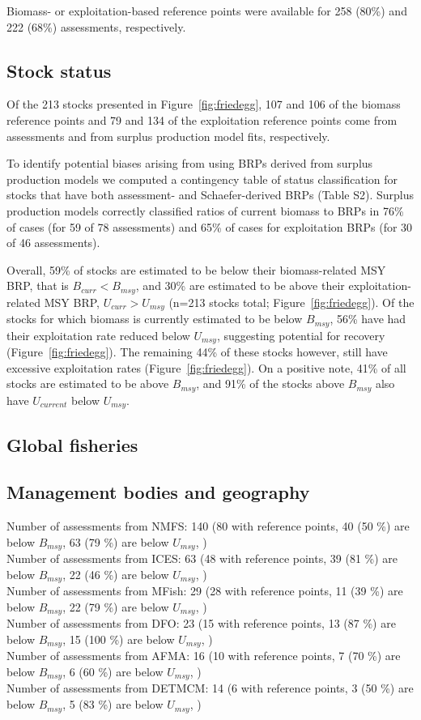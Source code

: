 Biomass- or exploitation-based reference points were available for
258 (80\%) and
222 (68\%)
assessments, respectively.

\subsection*{Stock status}
\noindent
Of the
213 stocks presented in
Figure~\ref{fig:friedegg}, 107 and
106 of the biomass reference points and
79 and
134 of the exploitation reference
points come from assessments and from surplus production model fits,
respectively.

To identify potential biases arising from using BRPs
derived from surplus production models we computed a contingency table
of status classification for stocks that have both assessment- and
Schaefer-derived BRPs (Table S2). Surplus production models correctly
classified ratios of current biomass to BRPs in
76\% of cases (for 59
of 78 assessments) and 65\%
of cases for exploitation BRPs (for 30 of
46 assessments).

Overall, 59\% of stocks are estimated
to be below their biomass-related MSY BRP, that is $B_{curr}<B_{msy}$,
and 30\% are estimated to be above
their exploitation-related MSY BRP, $U_{curr}>U_{msy}$
(n=213 stocks total; Figure~\ref{fig:friedegg}).
Of the stocks for which biomass is currently estimated to be below
$B_{msy}$, 56\% have had their
exploitation rate reduced below $U_{msy}$, suggesting potential for
recovery (Figure~\ref{fig:friedegg}). The remaining
44\% of these stocks however,
still have excessive exploitation rates
(Figure~\ref{fig:friedegg}). On a positive note,
41\% of all stocks are estimated to
be above $B_{msy}$, and 91\%
of the stocks above $B_{msy}$ also have $U_{current}$ below $U_{msy}$.


\subsection*{Global fisheries}

\subsection*{Management bodies and geography}
\noindent
Number of assessments from NMFS: 140 (80 with reference points, 40 (50 \%) are below $B_{msy}$, 63 (79 \%) are below $U_{msy}$, ) \\
Number of assessments from ICES: 63 (48 with reference points, 39 (81 \%) are below $B_{msy}$, 22 (46 \%) are below $U_{msy}$, ) \\
Number of assessments from MFish: 29 (28 with reference points, 11 (39 \%) are below $B_{msy}$, 22 (79 \%) are below $U_{msy}$, ) \\
Number of assessments from DFO: 23 (15 with reference points, 13 (87 \%) are below $B_{msy}$, 15 (100 \%) are below $U_{msy}$, ) \\
Number of assessments from AFMA: 16 (10 with reference points, 7 (70 \%) are below $B_{msy}$, 6 (60 \%) are below $U_{msy}$, ) \\
Number of assessments from DETMCM: 14 (6 with reference points, 3 (50 \%) are below $B_{msy}$, 5 (83 \%) are below $U_{msy}$, ) \\

